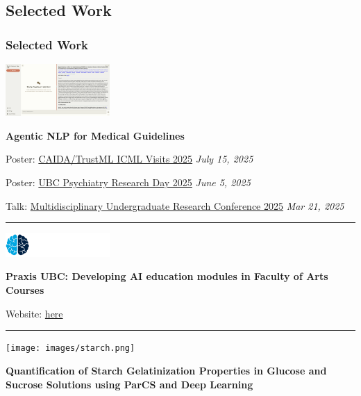 \documentclass[
  11pt,
]{article}
\begin{document}
\subsection{Selected Work}\label{selected-work}

\subsubsection{Selected Work}\label{selected-work-1}

\includegraphics[width=1.5625in,height=\textheight,keepaspectratio]{images/canmat_nlp.png}

\textbf{Agentic NLP for Medical Guidelines}

Poster:
\href{https://caida.ubc.ca/event/poster-session-caidatrustml-2025-icml-visits}{CAIDA/TrustML
ICML Visits 2025} \textbar{} \emph{July 15, 2025}

Poster: \href{https://psychiatry.ubc.ca/2025-eposter-gallery/}{UBC
Psychiatry Research Day 2025} \textbar{} \emph{June 5, 2025}

Talk:
\href{https://students.ubc.ca/career/events-workshops/multidisciplinary-undergraduate-research-conference/}{Multidisciplinary
Undergraduate Research Conference 2025} \textbar{} \emph{Mar 21, 2025}

\begin{center}\rule{0.5\linewidth}{0.5pt}\end{center}

\includegraphics[width=1.5625in,height=\textheight,keepaspectratio]{images/praxis.gif}

\textbf{Praxis UBC: Developing AI education modules in Faculty of Arts
Courses}

Website: \href{https://ubcecon.github.io/praxis-ubc/}{here}

\begin{center}\rule{0.5\linewidth}{0.5pt}\end{center}

\texttt{[image: images/starch.png]}

\textbf{Quantification of Starch Gelatinization Properties in Glucose
and Sucrose Solutions using ParCS and Deep Learning}
\end{document}
